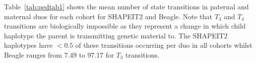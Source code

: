 Table~\ref{tab:pedtab1} shows the mean number of state transitions in paternal and maternal duos for each cohort for SHAPEIT2 and Beagle.  Note that $T_3$ and $T_4$ transitions are biologically impossible as they represent a change in which child haplotype the parent is transmitting genetic material to.  The SHAPEIT2 haplotypes have $<0.5$ of these transitions occurring per duo in all cohorts whilst Beagle ranges from 7.49 to 97.17 for $T_3$ transitions. 

\begin{table}
        \vspace{20pt}        
\begin{center}
\end{center}
\end{table}
